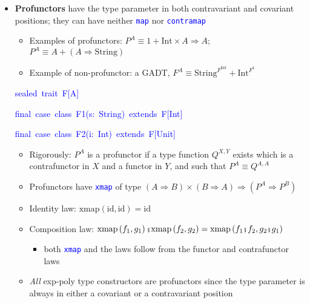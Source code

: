 \begin{itemize}
\item \textbf{Profunctors} have the type parameter in both contravariant
and covariant positions; they can have neither \texttt{\textcolor{blue}{\footnotesize{}map}}
nor \texttt{\textcolor{blue}{\footnotesize{}contramap}} 
\begin{itemize}
\item Examples of profunctors: {\footnotesize{}$P^{A}\equiv1+\text{Int}\times A\Rightarrow A$;
$P^{A}\equiv A+\left(A\Rightarrow\text{String}\right)$}{\footnotesize\par}
\item Example of non-profunctor: a GADT, {\footnotesize{}$F^{A}\equiv\text{String}^{F^{\text{Int}}}+\text{Int}^{F^{1}}$}{\footnotesize\par}
\end{itemize}
\begin{lyxcode}
\textcolor{blue}{\footnotesize{}sealed~trait~F{[}A{]}}{\footnotesize\par}

\textcolor{blue}{\footnotesize{}final~case~class~F1(s:~String)~extends~F{[}Int{]}}{\footnotesize\par}

\textcolor{blue}{\footnotesize{}final~case~class~F2(i:~Int)~extends~F{[}Unit{]}}{\footnotesize\par}
\end{lyxcode}
\begin{itemize}
\item Rigorously: $P^{A}$ is a profunctor if a type function $Q^{X,Y}$
exists which is a contrafunctor in $X$ and a functor in $Y$, and
such that $P^{A}\equiv Q^{A,A}$
\item Profunctors have \texttt{\textcolor{blue}{\footnotesize{}xmap}} of
type {\footnotesize{}$\left(A\Rightarrow B\right)\times\left(B\Rightarrow A\right)\Rightarrow(P^{A}\Rightarrow P^{B})$ }{\footnotesize\par}
\item Identity law: {\footnotesize{}$\text{xmap}\left(\text{id},\text{id}\right)=\text{id}$}{\footnotesize\par}
\item Composition law: {\footnotesize{}$\text{xmap}\left(f_{1},g_{1}\right)\bef\text{xmap}\left(f_{2},g_{2}\right)=\text{xmap}\left(f_{1}\bef f_{2},g_{2}\bef g_{1}\right)$}{\footnotesize\par}
\begin{itemize}
\item both \texttt{\textcolor{blue}{\footnotesize{}xmap}} and the laws follow
from the functor and contrafunctor laws
\end{itemize}
\item \emph{All} exp-poly type constructors are profunctors since the type
parameter is always in either a covariant or a contravariant position
\end{itemize}
\end{itemize}


